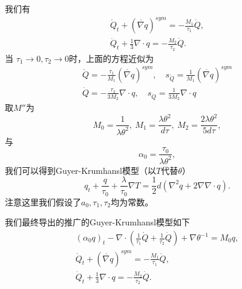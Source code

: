 我们有
\begin{eqnarray*}
\mathring{{Q}}_t+(\mathring{\nabla {q}})^{sym}=-\frac{M_1}{\tau_1}\mathring{{Q}}, \\
\dot{Q}_t+\frac{1}{3} \nabla \cdot {q}=-\frac{M_2}{\tau_2}\dot{Q}.
\end{eqnarray*}
当 $\tau_1 \to 0, \tau_2 \to 0$时，上面的方程近似为
\begin{eqnarray*} 
\mathring{{Q}}=-\frac{\tau_1}{M_1}(\mathring{\nabla {q}})^{sym} ,\quad   s_{\mathring{Q}}=\frac{1}{M_1}(\mathring{\nabla {q}})^{sym} \\
\dot{Q}=-\frac{\tau_2}{3M_2}\nabla \cdot {q} , \quad   s_{\dot{Q}}=\frac{1}{3M_2} \nabla \cdot {q}
\end{eqnarray*}
取$M''$为
\begin{equation}
M_0=\frac{1}{\lambda \theta^2},\ M_1=\frac{\lambda \theta^2}{d\tau},\ M_2=\frac{2\lambda \theta^2}{5d\tau},
\end{equation}
与
$$\alpha_0=\frac{\tau_0}{\lambda \theta^2},$$
我们可以得到Guyer-Krumhansl模型（以$T$代替$\theta$）\cite{jou1996extended}
\begin{equation}
{q}_t+\frac{{q}}{\tau_0}+\frac{\lambda}{\tau_0}\nabla T=\frac{1}{2}d(\nabla^2 {q}+2\nabla \nabla \cdot {q}).
\end{equation}
注意这里我们假设了$a_0,\tau_1,\tau_2$均为常数。


我们最终导出的推广的Guyer-Krumhansl模型如下
\begin{subequations}\label{eq:EGK}
	\begin{align}
(\alpha_0 {q})_t - \nabla \cdot ({\frac{1}{\tau_1} \mathring{{Q}}}+\frac{1}{\tau_2}\dot{Q})+\nabla \theta^{-1} = M_0 {q}, \\
\mathring{{Q}}_t+(\mathring{\nabla {q}})^{sym}=-\frac{M_1}{\tau_1}\mathring{{Q}}, \\
\dot{Q}_t+\frac{1}{3} \nabla \cdot {q}=-\frac{M_2}{\tau_2} \dot{Q}.
	\end{align}
\end{subequations}

